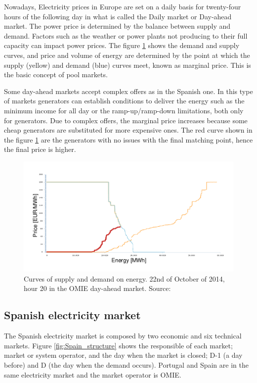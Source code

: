\documentclass[a4paper,11pt,twoside,openright]{report}
\begin{document}
Nowadays, Electricity prices in Europe are set on a daily basis for twenty-four hours of the following day in what is called the Daily market or Day-ahead market. The power price is determined by the balance between supply and demand. Factors such as the weather or power plants not producing to their full capacity can impact power prices.
The figure \ref{fig:bids-offers} shows the demand and supply curves, and price and volume of energy are determined by the point at which the supply (yellow) and demand (blue) curves meet, known as marginal price. This is the basic concept of pool markets. 

Some day-ahead markets accept complex offers as in the Spanish one. In this type of markets generators can establish conditions to deliver the energy such as the minimum income for all day or the ramp-up/ramp-down limitations, both only for generators. 
Due to complex offers, the marginal price increases because some cheap generators are substituted for more expensive ones. The red curve shown in the figure \ref{fig:bids-offers} are the generators with no issues with the final matching point, hence the final price is higher. 

\begin{figure}[h!]
	\centering
	\includegraphics[scale=0.9]{Visios/Captura_mercado_diario}
	\caption{Curves of supply and demand on energy. 22nd of October of 2014, hour 20 in the OMIE day-ahead market. Source: \cite{OMIE_22102014}}
	\label{fig:bids-offers}
\end{figure}

\subsection{Spanish electricity market}
The Spanish electricity market is composed by two economic and six technical markets. Figure \ref{fig:Spain_structure} shows the responsible of each market; market or system operator, and the day when the market is closed; D-1 (a day before) and D (the day when the demand occurs). Portugal and Spain are in the same electricity market and the market operator is OMIE.
\end{document}
